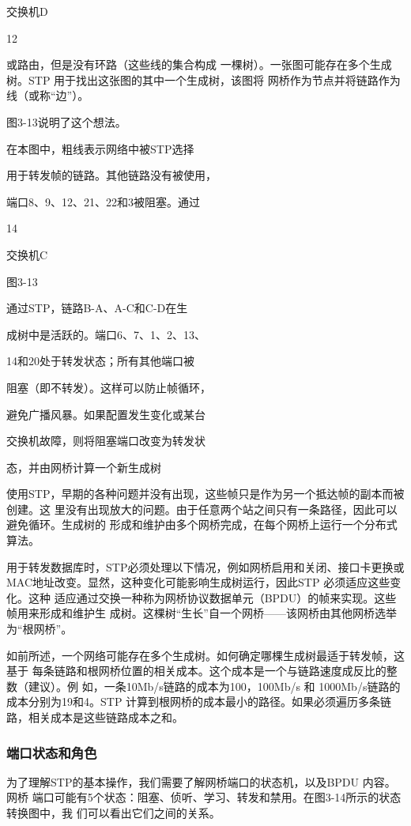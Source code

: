 交换机D

12

或路由，但是没有环路（这些线的集合构成
一棵树）。一张图可能存在多个生成树。STP
用于找出这张图的其中一个生成树，该图将
网桥作为节点并将链路作为线（或称“边”）。

图3-13说明了这个想法。

在本图中，粗线表示网络中被STP选择

用于转发帧的链路。其他链路没有被使用，

端口8、9、12、21、22和3被阻塞。通过

14

交换机C

图3-13

通过STP，链路B-A、A-C和C-D在生

成树中是活跃的。端口6、7、1、2、13、

14和20处于转发状态；所有其他端口被

阻塞（即不转发）。这样可以防止帧循环，

避免广播风暴。如果配置发生变化或某台

交换机故障，则将阻塞端口改变为转发状

态，并由网桥计算一个新生成树

使用STP，早期的各种问题并没有出现，这些帧只是作为另一个抵达帧的副本而被创建。这
里没有出现放大的问题。由于任意两个站之间只有一条路径，因此可以避免循环。生成树的
形成和维护由多个网桥完成，在每个网桥上运行一个分布式算法。

用于转发数据库时，STP必须处理以下情况，例如网桥启用和关闭、接口卡更换或
MAC地址改变。显然，这种变化可能影响生成树运行，因此STP 必须适应这些变化。这种
适应通过交换一种称为网桥协议数据单元（BPDU）的帧来实现。这些帧用来形成和维护生
成树。这棵树“生长”自一个网桥——该网桥由其他网桥选举为“根网桥”。

如前所述，一个网络可能存在多个生成树。如何确定哪棵生成树最适于转发帧，这基于
每条链路和根网桥位置的相关成本。这个成本是一个与链路速度成反比的整数（建议）。例
如，一条10Mb/s链路的成本为100，100Mb/s 和 1000Mb/s链路的成本分别为19和4。STP
计算到根网桥的成本最小的路径。如果必须遍历多条链路，相关成本是这些链路成本之和。

\subsubsection{端口状态和角色}

为了理解STP的基本操作，我们需要了解网桥端口的状态机，以及BPDU 内容。网桥
端口可能有5个状态：阻塞、侦听、学习、转发和禁用。在图3-14所示的状态转换图中，我
们可以看出它们之间的关系。

